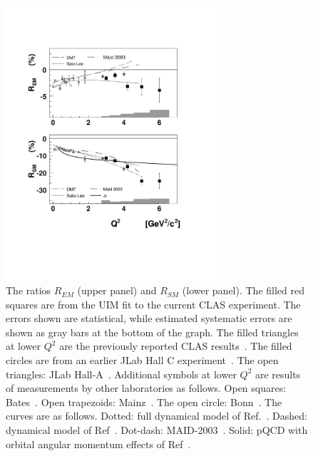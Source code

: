\documentclass[aps,prl,twocolumn,superscriptaddress]{revtex4}
\begin{document}
\begin{figure}[t]
 \includegraphics[height=10.2cm, bb=60 150 510 690]{img/ratios_bw}
 \caption{ The ratios $R_{EM}$ (upper panel) and $R_{SM}$ (lower panel).
           The filled red squares are from the UIM fit to the current CLAS 
           experiment. The errors shown are statistical, while estimated 
           systematic errors are shown as gray bars at the bottom of the 
           graph. 
           The filled  triangles at lower $Q^2$ are the previously reported  
           CLAS results~\cite{bib:colejoo}. The filled  circles are from an 
           earlier JLab Hall C  experiment~\cite{bib:frolov, bib:DMT}.  
           The open triangles: JLab Hall-A~\cite{bib:hall-A}. Additional 
           symbols at lower  $Q^2$ are results of measurements  by other 
           laboratories as follows. Open squares: Bates~\cite{bib:bates}. 
           Open trapezoids: Mainz~\cite{bib:mami}. The open circle: 
           Bonn~\cite{bib:elsa}. The curves are as follows. Dotted: full 
           dynamical model of Ref.~\cite{bib:sato-lee}. Dashed: dynamical 
           model of Ref~\cite{bib:DMT}. Dot-dash: MAID-2003~\cite{bib:maid}. 
           Solid: pQCD with orbital angular momentum effects of 
           Ref~\cite{bib:Ji-pqcd}.}
\label{fig:EM-SM-JANR}
\end{figure} 
\end{document}

